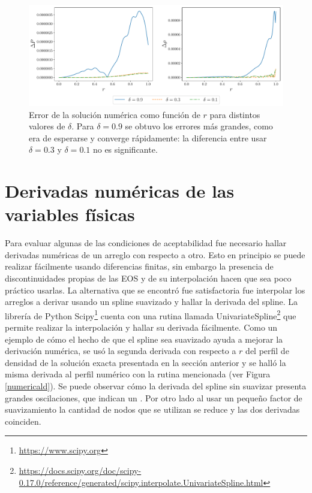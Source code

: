 \begin{figure}[H]
    \centering
    \includegraphics[width=\linewidth]{figures/ErrorTolmanVIImu45.pdf}
    \caption[Error de la solución numérica respecto a la exacta]{Error de la solución numérica como función de $r$ para distintos valores de $\delta$. Para $\delta=0.9$ se obtuvo los errores más grandes, como era de esperarse y converge rápidamente: la diferencia entre usar $\delta=0.3$ y $\delta=0.1$ no es significante.}
    \label{ErrorExact}
\end{figure}


\section{Derivadas numéricas de las variables físicas}\label{NumDer}  

\noindent Para evaluar algunas de las condiciones de aceptabilidad fue necesario hallar derivadas numéricas de un arreglo con respecto a otro. Esto en principio se puede realizar fácilmente usando diferencias finitas, sin embargo la presencia de discontinuidades propias de las EOS y de su interpolación hacen que sea poco práctico usarlas. La alternativa que se encontró fue satisfactoria fue interpolar los arreglos a derivar usando un spline suavizado y hallar la derivada del spline. La librería de Python Scipy\footnote{\url{https://www.scipy.org}} cuenta con una rutina llamada UnivariateSpline\footnote{\url{https://docs.scipy.org/doc/scipy-0.17.0/reference/generated/scipy.interpolate.UnivariateSpline.html}} que permite realizar la interpolación y hallar su derivada fácilmente. Como un ejemplo de cómo el hecho de que el spline sea suavizado ayuda a mejorar la derivación numérica, se usó la segunda derivada con respecto a $r$ del perfil de densidad de la solución exacta presentada en la sección anterior y se halló la misma derivada al perfil numérico con la rutina mencionada (ver Figura \ref{numericald}). Se puede observar cómo la derivada del spline sin suavizar presenta grandes oscilaciones, que indican un . Por otro lado al usar un pequeño factor de suavizamiento la cantidad de nodos que se utilizan se reduce y las dos derivadas coinciden.

